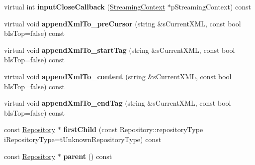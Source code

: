 \begin{DoxyCompactItemize}
\item 
\hypertarget{classgeneral__server_1_1Repository_a05aded2eef63079a93b6d1aa389a3f19}{virtual int {\bfseries input\-Close\-Callback} (\hyperlink{classgeneral__server_1_1Repository_1_1StreamingContext}{\-Streaming\-Context} $\ast$p\-Streaming\-Context) const }\label{classgeneral__server_1_1Repository_a05aded2eef63079a93b6d1aa389a3f19}

\item 
\hypertarget{classgeneral__server_1_1Repository_add2891439ee828aaf7e2a339b03a8d91}{virtual void {\bfseries append\-Xml\-To\-\_\-pre\-Cursor} (string \&s\-Current\-X\-M\-L, const bool b\-Is\-Top=false) const }\label{classgeneral__server_1_1Repository_add2891439ee828aaf7e2a339b03a8d91}

\item 
\hypertarget{classgeneral__server_1_1Repository_adddd0873c81ebc7107dbe5ea2d1cf116}{virtual void {\bfseries append\-Xml\-To\-\_\-start\-Tag} (string \&s\-Current\-X\-M\-L, const bool b\-Is\-Top=false) const }\label{classgeneral__server_1_1Repository_adddd0873c81ebc7107dbe5ea2d1cf116}

\item 
\hypertarget{classgeneral__server_1_1Repository_a4345458a60d88b5be9e934e58191e38a}{virtual void {\bfseries append\-Xml\-To\-\_\-content} (string \&s\-Current\-X\-M\-L, const bool b\-Is\-Top=false) const }\label{classgeneral__server_1_1Repository_a4345458a60d88b5be9e934e58191e38a}

\item 
\hypertarget{classgeneral__server_1_1Repository_a11146c2e3f9928a28dd2da40986cb117}{virtual void {\bfseries append\-Xml\-To\-\_\-end\-Tag} (string \&s\-Current\-X\-M\-L, const bool b\-Is\-Top=false) const }\label{classgeneral__server_1_1Repository_a11146c2e3f9928a28dd2da40986cb117}

\item 
\hypertarget{classgeneral__server_1_1Repository_ae585c0058a559baaf56f313826661357}{const \hyperlink{classgeneral__server_1_1Repository}{\-Repository} $\ast$ {\bfseries first\-Child} (const \-Repository\-::repository\-Type i\-Repository\-Type=t\-Unknown\-Repository\-Type) const }\label{classgeneral__server_1_1Repository_ae585c0058a559baaf56f313826661357}

\item 
\hypertarget{classgeneral__server_1_1Repository_a8e750cfb2ffc96e5b20fcacee49e77c0}{const \hyperlink{classgeneral__server_1_1Repository}{\-Repository} $\ast$ {\bfseries parent} () const }\label{classgeneral__server_1_1Repository_a8e750cfb2ffc96e5b20fcacee49e77c0}


\end{DoxyCompactItemize}
